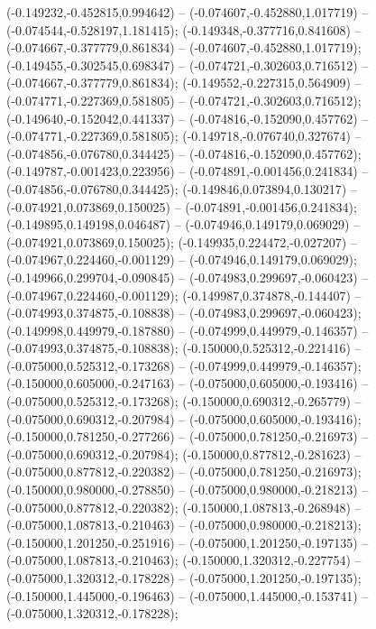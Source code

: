  (-0.149232,-0.452815,0.994642) -- (-0.074607,-0.452880,1.017719) -- (-0.074544,-0.528197,1.181415);
 (-0.149348,-0.377716,0.841608) -- (-0.074667,-0.377779,0.861834) -- (-0.074607,-0.452880,1.017719);
 (-0.149455,-0.302545,0.698347) -- (-0.074721,-0.302603,0.716512) -- (-0.074667,-0.377779,0.861834);
 (-0.149552,-0.227315,0.564909) -- (-0.074771,-0.227369,0.581805) -- (-0.074721,-0.302603,0.716512);
 (-0.149640,-0.152042,0.441337) -- (-0.074816,-0.152090,0.457762) -- (-0.074771,-0.227369,0.581805);
 (-0.149718,-0.076740,0.327674) -- (-0.074856,-0.076780,0.344425) -- (-0.074816,-0.152090,0.457762);
 (-0.149787,-0.001423,0.223956) -- (-0.074891,-0.001456,0.241834) -- (-0.074856,-0.076780,0.344425);
 (-0.149846,0.073894,0.130217) -- (-0.074921,0.073869,0.150025) -- (-0.074891,-0.001456,0.241834);
 (-0.149895,0.149198,0.046487) -- (-0.074946,0.149179,0.069029) -- (-0.074921,0.073869,0.150025);
 (-0.149935,0.224472,-0.027207) -- (-0.074967,0.224460,-0.001129) -- (-0.074946,0.149179,0.069029);
 (-0.149966,0.299704,-0.090845) -- (-0.074983,0.299697,-0.060423) -- (-0.074967,0.224460,-0.001129);
 (-0.149987,0.374878,-0.144407) -- (-0.074993,0.374875,-0.108838) -- (-0.074983,0.299697,-0.060423);
 (-0.149998,0.449979,-0.187880) -- (-0.074999,0.449979,-0.146357) -- (-0.074993,0.374875,-0.108838);
 (-0.150000,0.525312,-0.221416) -- (-0.075000,0.525312,-0.173268) -- (-0.074999,0.449979,-0.146357);
 (-0.150000,0.605000,-0.247163) -- (-0.075000,0.605000,-0.193416) -- (-0.075000,0.525312,-0.173268);
 (-0.150000,0.690312,-0.265779) -- (-0.075000,0.690312,-0.207984) -- (-0.075000,0.605000,-0.193416);
 (-0.150000,0.781250,-0.277266) -- (-0.075000,0.781250,-0.216973) -- (-0.075000,0.690312,-0.207984);
 (-0.150000,0.877812,-0.281623) -- (-0.075000,0.877812,-0.220382) -- (-0.075000,0.781250,-0.216973);
 (-0.150000,0.980000,-0.278850) -- (-0.075000,0.980000,-0.218213) -- (-0.075000,0.877812,-0.220382);
 (-0.150000,1.087813,-0.268948) -- (-0.075000,1.087813,-0.210463) -- (-0.075000,0.980000,-0.218213);
 (-0.150000,1.201250,-0.251916) -- (-0.075000,1.201250,-0.197135) -- (-0.075000,1.087813,-0.210463);
 (-0.150000,1.320312,-0.227754) -- (-0.075000,1.320312,-0.178228) -- (-0.075000,1.201250,-0.197135);
 (-0.150000,1.445000,-0.196463) -- (-0.075000,1.445000,-0.153741) -- (-0.075000,1.320312,-0.178228);
